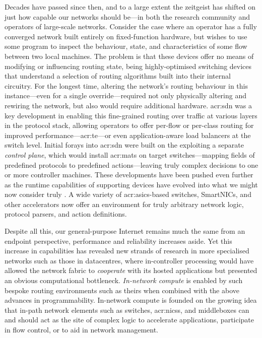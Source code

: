 Decades have passed since then, and to a large extent the zeitgeist has shifted on just how capable our networks should be---in both the research community and operators of large-scale networks.
Consider the case where an operator has a fully converged network built entirely on fixed-function hardware, but wishes to use some program to inspect the behaviour, state, and characteristics of some flow between two local machines.
The problem is that these devices offer no means of modifying or influencing routing state, being highly-optimised switching devices that understand a selection of routing algorithms built into their internal circuitry.
For the longest time, altering the network's routing behaviour in this instance---even for a single override---required not only physically altering and rewiring the network, but also would require additional hardware.
\gls{acr:sdn} was a key development in enabling this fine-grained routing over traffic at various layers in the protocol stack, allowing operators to offer per-flow or per-class routing for improved performance---\gls{acr:te}---or even application-aware load balancers at the switch level.
Initial forays into \gls{acr:sdn} were built on the exploiting a separate \emph{control plane}, which would install \glspl{acr:mat} on target switches---mapping fields of predefined protocols to predefined actions---leaving truly complex decisions to one or more controller machines.
These developments have been pushed even further as the runtime capabilities of supporting devices have evolved into what we might now consider truly .
A wide variety of \glspl{acr:asic}-based switches, SmartNICs, and other accelerators now offer an environment for truly arbitrary network logic, protocol parsers, and action definitions.

Despite all this, our general-purpose Internet remains much the same from an endpoint perspective, performance and reliability increases aside.
Yet this increase in capabilities has revealed new strands of research in more specialised networks such as those in datacentres, where in-controller processing would have allowed the network fabric to \emph{cooperate} with its hosted applications but presented an obvious computational bottleneck.
\emph{In-network compute} is enabled by such bespoke routing environments such as theirs when combined with the above advances in programmability.
In-network compute is founded on the growing idea that in-path network elements such as switches, \glspl{acr:nic}s, and middleboxes can and should act as the site of complex logic to accelerate applications, participate in flow control, or to aid in network management.
%
%
%

